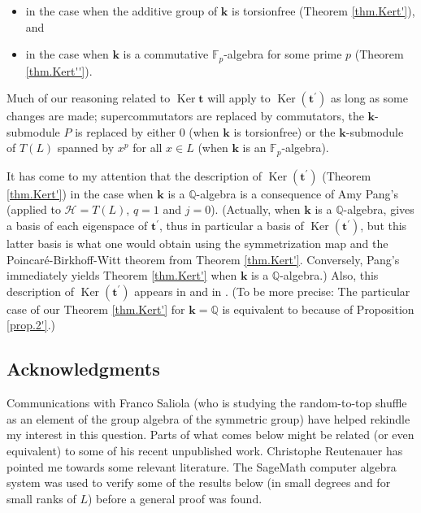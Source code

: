 \documentclass[numbers=enddot,12pt,final,onecolumn,notitlepage]{scrartcl}%
\theoremstyle{definition}
\begin{document}
\begin{itemize}
\item in the case when the additive group of $\mathbf{k}$ is torsionfree
(Theorem \ref{thm.Kert'}), and

\item in the case when $\mathbf{k}$ is a commutative $\mathbb{F}_{p}$-algebra
for some prime $p$ (Theorem \ref{thm.Kert''}).
\end{itemize}

Much of our reasoning related to $\operatorname*{Ker}\mathbf{t}$ will apply to
$\operatorname*{Ker}\left(  \mathbf{t}^{\prime}\right)  $ as long as some
changes are made; supercommutators are replaced by commutators, the
$\mathbf{k}$-submodule $P$ is replaced by either $0$ (when $\mathbf{k}$ is
torsionfree) or the $\mathbf{k}$-submodule of $T\left(  L\right)  $ spanned by
$x^{p}$ for all $x\in L$ (when $\mathbf{k}$ is an $\mathbb{F}_{p}$-algebra).

It has come to my attention that the description of $\operatorname*{Ker}%
\left(  \mathbf{t}^{\prime}\right)  $ (Theorem \ref{thm.Kert'}) in the case
when $\mathbf{k}$ is a $\mathbb{Q}$-algebra is a consequence of Amy Pang's
\cite[Theorem 5.1]{pang} (applied to $\mathcal{H}=T\left(  L\right)  $, $q=1$
and $j=0$). (Actually, when $\mathbf{k}$ is a $\mathbb{Q}$-algebra,
\cite[Theorem 5.1]{pang} gives a basis of each eigenspace of $\mathbf{t}%
^{\prime}$, thus in particular a basis of $\operatorname*{Ker}\left(
\mathbf{t}^{\prime}\right)  $, but this latter basis is what one would obtain
using the symmetrization map and the Poincar\'{e}-Birkhoff-Witt theorem from
Theorem \ref{thm.Kert'}. Conversely, Pang's \cite[Theorem 5.1]{pang}
immediately yields Theorem \ref{thm.Kert'} when $\mathbf{k}$ is a $\mathbb{Q}%
$-algebra.) Also, this description of $\operatorname*{Ker}\left(
\mathbf{t}^{\prime}\right)  $ appears in \cite[Proposition 6.1]{BRRZ08} and in
\cite[\S 1.6.5, p. 36]{Reuten93}. (To be more precise: The particular case of
our Theorem \ref{thm.Kert'} for $\mathbf{k}=\mathbb{Q}$ is equivalent to
\cite[Proposition 6.1]{BRRZ08} because of Proposition \ref{prop.2'}.)

\subsection{Acknowledgments}

Communications with Franco Saliola (who is studying the random-to-top shuffle
as an element of the group algebra of the symmetric group) have helped
rekindle my interest in this question. Parts of what comes below might be
related (or even equivalent) to some of his recent unpublished work.
Christophe Reutenauer has pointed me towards some relevant literature. The
SageMath computer algebra system \cite{sage} was used to verify some of the
results below (in small degrees and for small ranks of $L$) before a general
proof was found.
\end{document}
